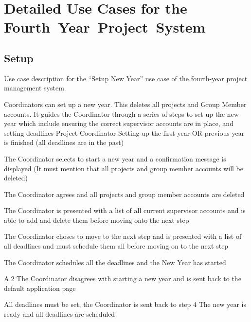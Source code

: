 \documentclass[document.tex]{subfiles}
\begin{document}
\chapter {Detailed Use Cases for the Fourth~Year~Project~System}
\label {ch:detailed-use-cases-1}

\section {Setup}
\label {sec:detailed-use-cases-1-setup}

\begin{table}[!htbp]
  \centering
  \caption{Use case description for the ``Setup New Year'' use case of the fourth-year project management system.}
  \label{tbl:use-case-start-new-year}

  \begin{usecase}
    Coordinators can set up a new year. This deletes all projects and Group Member accounts. It guides the Coordinator through a series of steps to set up the new year which include ensuring the correct supervisor accounts are in place, and setting deadlines
    Project Coordinator
    Setting up the first year OR previous year is finished (all deadlines are in the past)
    \ucnormal
    \begin{ucenum}
      \item The Coordinator selects to start a new year and a confirmation message is displayed (It must mention that all projects and group member accounts will be deleted)
      \item The Coordinator agrees and all projects and group member accounts are deleted
      \item The Coordinator is presented with a list of all current supervisor accounts and is able to add and delete them before moving onto the next step
      \item The Coordinator choses to move to the next step and is presented with a list of all deadlines and must schedule them all before moving on to the next step
      \item The Coordinator schedules all the deadlines and the New Year has started
    \end{ucenum}
    \begin{ucenum*}
      \item [A.2] The Coordinator disagrees with starting a new year and is sent back to the default application page
    \end{ucenum*}
    All deadlines must be set, the Coordinator is sent back to step 4
    The new year is ready and all deadlines are scheduled
  \end{usecase}
\end{table}
\end{document}
